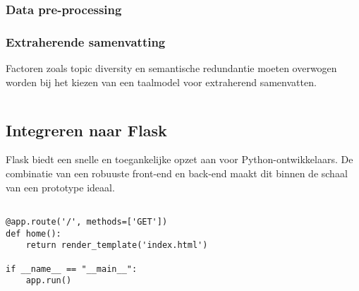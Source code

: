 \begin{lstlisting}

\end{lstlisting}

\subsubsection{Data pre-processing}


\subsubsection{Extraherende samenvatting}

Factoren zoals topic diversity en semantische redundantie moeten overwogen worden bij het kiezen van een taalmodel voor extraherend samenvatten.

\begin{lstlisting}

\end{lstlisting}

\subsection{Integreren naar Flask}

Flask biedt een snelle en toegankelijke opzet aan voor Python-ontwikkelaars. De combinatie van een robuuste front-end en back-end maakt dit binnen de schaal van een prototype ideaal.

\begin{lstlisting}

@app.route('/', methods=['GET'])
def home():
	return render_template('index.html')

if __name__ == "__main__":
	app.run()
\end{lstlisting}


